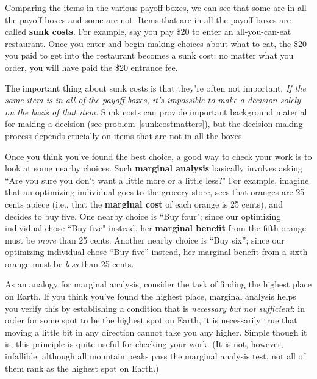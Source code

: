 

Comparing the items in the various payoff boxes, we can see that some are in all the payoff boxes and some are not. Items that are in all the payoff boxes are called \textbf{sunk costs}. For example, say you pay \$20 to enter an all-you-can-eat restaurant. Once you enter and begin making choices about what to eat, the \$20 you paid to get into the restaurant becomes a sunk cost: no matter what you order, you will have paid the \$20 entrance fee.

The important thing about sunk costs is that they're often not important. \emph{If the same item is in all of the payoff boxes, it's impossible to make a decision solely on the basis of that item.} Sunk costs can provide important background material for making a decision (see problem~\ref{sunkcostmatters}), but the decision-making process depends crucially on items that are not in all the boxes.

Once you think you've found the best choice, a good way to check your work is to look at some nearby choices. Such \textbf{marginal analysis} basically involves asking ``Are you sure you don't want a little more or a little less?" For example, imagine that an optimizing individual goes to the grocery store, sees that oranges are 25 cents apiece (i.e., that the \textbf{marginal cost} of each orange is 25 cents), and decides to buy five. One nearby choice is ``Buy four"; since our optimizing individual chose ``Buy five" instead, her \textbf{marginal benefit} from the fifth orange must be \emph{more} than 25 cents. Another nearby choice is ``Buy six''; since our optimizing individual chose ``Buy five'' instead,  her marginal benefit from a sixth orange must be \emph{less} than 25 cents.


As an analogy for marginal analysis, consider the task of finding the highest place on Earth. If you think you've found the highest place, marginal analysis helps you verify this by establishing a condition that is \emph{necessary but not sufficient}: in order for some spot to be the highest spot on Earth, it is necessarily true that moving a little bit in any direction cannot take you any higher. Simple though it is, this principle is quite useful for checking your work. (It is not, however, infallible: although all mountain peaks pass the marginal analysis test, not all of them rank as the highest spot on Earth.)


